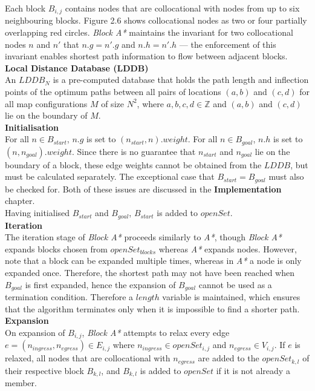 \documentclass[12pt,notitlepage]{report}
\begin{document}
\noindent
Each block $B_{i,j}$ contains nodes that are collocational with nodes from up to six neighbouring blocks. Figure 2.6 shows collocational nodes as two or four partially overlapping red circles. {\em Block A*} maintains the invariant for two collocational nodes $n$ and $n'$ that $n.g = n'.g$ and $n.h = n'.h$ --- the enforcement of this invariant enables shortest path information to flow between adjacent blocks.\\

\noindent
{\bfseries Local Distance Database (LDDB)}\\
\noindent
An $LDDB_{N}$ is a pre-computed database that holds the path length and inflection points of the optimum paths between all pairs of locations $(a,b)$ and $(c,d)$ for all map configurations $M$ of size $N^{2}$, where $a,b,c,d \in \mathbb{Z}$ and $(a,b)$ and $(c,d)$ lie on the boundary of $M$.\\

\noindent
{\bfseries Initialisation}\\
\noindent
For all $n \in B_{start}$, $n.g$ is set to $(n_{start},n).weight$. For all $n \in B_{goal}$, $n.h$ is set to $(n,n_{goal}).weight$. Since there is no guarantee that $n_{start}$ and $n_{goal}$ lie on the boundary of a block, these edge weights cannot be obtained from the $LDDB$, but must be calculated separately. The exceptional case that $B_{start} = B_{goal}$ must also be checked for. Both of these issues are discussed in the {\bfseries Implementation} chapter.\\

\noindent
Having initialised $B_{start}$ and $B_{goal}$, $B_{start}$ is added to $openSet$.\\

\noindent
{\bfseries Iteration}\\
\noindent
The iteration stage of {\em Block A*} proceeds similarly to {\em A*}, though {\em Block A*} expands blocks chosen from $openSet_{blocks}$ whereas {\em A*} expands nodes. However, note that a block can be expanded multiple times, whereas in {\em A*} a node is only expanded once. Therefore, the shortest path may not have been reached when $B_{goal}$ is first expanded, hence the expansion of $B_{goal}$ cannot be used as a termination condition. Therefore a $length$ variable is maintained, which ensures that the algorithm terminates only when it is impossible to find a shorter path.\\

\noindent
{\bfseries Expansion}\\
\noindent
On expansion of $B_{i,j}$, {\em Block A*} attempts to relax every edge $e=(n_{ingress},n_{egress}) \in E_{i,j}$ where $n_{ingress} \in openSet_{i,j}$ and $n_{egress} \in V_{i,j}$. If $e$ is relaxed, all nodes that are collocational with $n_{egress}$ are added to the $openSet_{k,l}$ of their respective block $B_{k,l}$, and $B_{k,l}$ is added to $openSet$ if it is not already a member. \\
\end{document}
